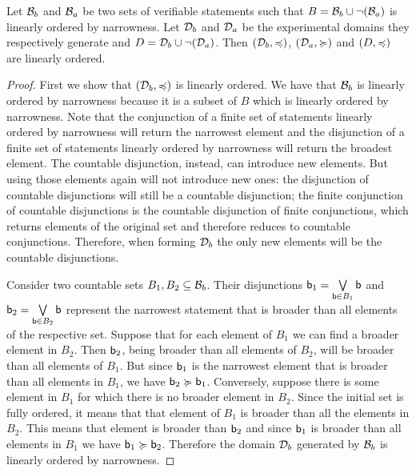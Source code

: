 \begin{mathSection}
	\begin{prop}\label{pm-pq-generatedOrder}
		Let $\basis_b$ and $\basis_a$ be two sets of verifiable statements such that $B = \basis_b \cup \NOT(\basis_a)$ is linearly ordered by narrowness. Let $\edomain_b$ and $\edomain_a$ be the experimental domains they respectively generate and $D = \edomain_b \cup \NOT(\edomain_a)$. Then $(\edomain_b, \narrower)$, $(\edomain_a, \broader)$ and $(D, \narrower)$ are linearly ordered.
	\end{prop}
	
	\begin{proof}
		First we show that $(\edomain_b, \narrower)$ is linearly ordered. We have that $\basis_b$ is linearly ordered by narrowness because it is a subset of $B$ which is linearly ordered by narrowness. Note that the conjunction of a finite set of statements linearly ordered by narrowness will return the narrowest element and the disjunction of a finite set of statements linearly ordered by narrowness will return the broadest element. The countable disjunction, instead, can introduce new elements. But using those elements again will not introduce new ones: the disjunction of countable disjunctions will still be a countable disjunction; the finite conjunction of countable disjunctions is the countable disjunction of finite conjunctions, which returns elements of the original set and therefore reduces to countable conjunctions. Therefore, when forming $\edomain_b$ the only new elements will be the countable disjunctions.
		
		Consider two countable sets $B_1, B_2 \subseteq \basis_b$. Their disjunctions $\stmt[b]_1 = \bigOR\limits_{\stmt[b] \in B_1} \stmt[b]$ and $\stmt[b]_2 = \bigOR\limits_{\stmt[b] \in B_2} \stmt[b]$ represent the narrowest statement that is broader than all elements of the respective set. Suppose that for each element of $B_1$ we can find a broader element in $B_2$. Then $\stmt[b]_2$, being broader than all elements of $B_2$, will be broader than all elements of $B_1$. But since $\stmt[b]_1$ is the narrowest element that is broader than all elements in $B_1$, we have $\stmt[b]_2 \broader \stmt[b]_1$. Conversely, suppose there is some element in $B_1$ for which there is no broader element in $B_2$. Since the initial set is fully ordered, it means that that element of $B_1$ is broader than all the elements in $B_2$. This means that element is broader than $\stmt[b]_2$ and since $\stmt[b]_1$ is broader than all elements in $B_1$ we have $\stmt[b]_1 \broader \stmt[b]_2$. Therefore the domain $\edomain_b$ generated by $\basis_b$ is linearly ordered by narrowness.
		

\end{proof}
\end{mathSection}
